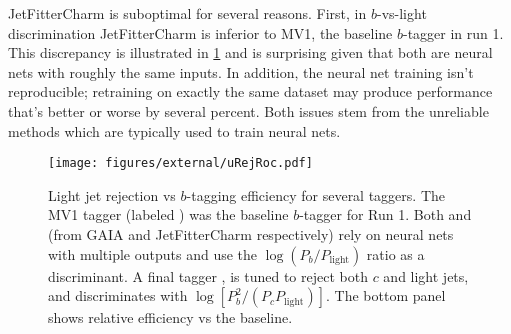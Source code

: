 JetFitterCharm is suboptimal for several reasons.
First, in $b$-vs-light discrimination JetFitterCharm is inferior to MV1, the baseline $b$-tagger in run 1. This discrepancy is illustrated in \cref{fig:u-rej-roc} and is surprising given that both are neural nets with roughly the same inputs.
In addition, the neural net training isn't reproducible; retraining on exactly the same dataset may produce performance that's better or worse by several percent.
Both issues stem from the unreliable methods which are typically used to train neural nets.

\begin{figure}
  \begin{center}
    \texttt{[image: figures/external/uRejRoc.pdf]}
    \caption[Light jet rejection as a function of $b$-tagging efficiency]{Light jet rejection vs $b$-tagging efficiency for several taggers. The MV1 tagger (labeled ) was the baseline $b$-tagger for Run 1. Both  and  (from  GAIA and JetFitterCharm respectively) rely on neural nets with multiple outputs and use the $\log (P_{b} / P_{\text{light}})$ ratio as a discriminant. A final tagger , is tuned to reject both $c$ and light jets, and discriminates with $\log [P_{b}^2 / (P_{c} P_{\text{light}})]$.  The bottom panel shows relative efficiency vs the  baseline.}
    \label{fig:u-rej-roc}
  \end{center}
\end{figure}

